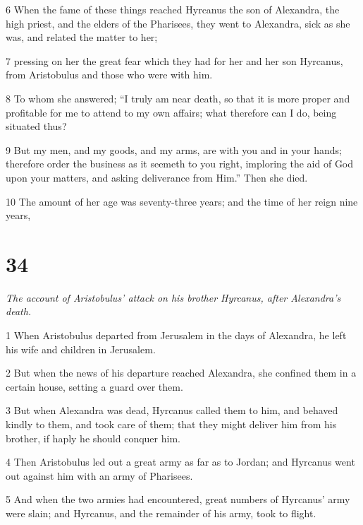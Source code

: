 \par 6 When the fame of these things reached Hyrcanus the son of Alexandra, the high priest, and the elders of the Pharisees, they went to Alexandra, sick as she was, and related the matter to her; 

\par 7 pressing on her the great fear which they had for her and her son Hyrcanus, from Aristobulus and those who were with him. 

\par 8 To whom she answered; “I truly am near death, so that it is more proper and profitable for me to attend to my own affairs; what therefore can I do, being situated thus? 

\par 9 But my men, and my goods, and my arms, are with you and in your hands; therefore order the business as it seemeth to you right, imploring the aid of God upon your matters, and asking deliverance from Him.” Then she died. 

\par 10 The amount of her age was seventy-three years; and the time of her reign nine years,

\chapter{34}

\par \textit{The account of Aristobulus’ attack on his brother Hyrcanus, after Alexandra’s death.}

\par 1 When Aristobulus departed from Jerusalem in the days of Alexandra, he left his wife and children in Jerusalem. 

\par 2 But when the news of his departure reached Alexandra, she confined them in a certain house, setting a guard over them. 

\par 3 But when Alexandra was dead, Hyrcanus called them to him, and behaved kindly to them, and took care of them; that they might deliver him from his brother, if haply he should conquer him. 

\par 4 Then Aristobulus led out a great army as far as to Jordan; and Hyrcanus went out against him with an army of Pharisees. 

\par 5 And when the two armies had encountered, great numbers of Hyrcanus’ army were slain; and Hyrcanus, and the remainder of his army, took to flight. 

